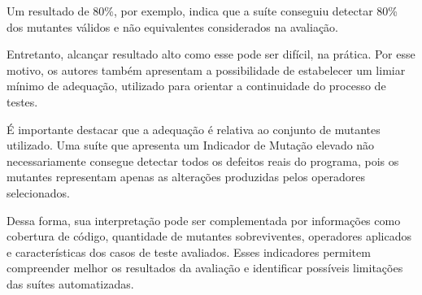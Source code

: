 Um resultado de 80\%, por exemplo, indica que a suíte conseguiu detectar 80\% dos mutantes válidos e não equivalentes considerados na avaliação.

Entretanto, alcançar resultado alto como esse pode ser difícil, na prática. Por esse motivo, os autores também apresentam a possibilidade de estabelecer um limiar mínimo de adequação, utilizado para orientar a continuidade do processo de testes.

É importante destacar que a adequação é relativa ao conjunto de mutantes utilizado. Uma suíte que apresenta um Indicador de Mutação elevado não necessariamente consegue detectar todos os defeitos reais do programa, pois os mutantes representam apenas as alterações produzidas pelos operadores selecionados.

Dessa forma, sua interpretação pode ser complementada por informações como cobertura de código, quantidade de mutantes sobreviventes, operadores aplicados e características dos casos de teste avaliados. Esses indicadores permitem compreender melhor os resultados da avaliação e identificar possíveis limitações das suítes automatizadas.

